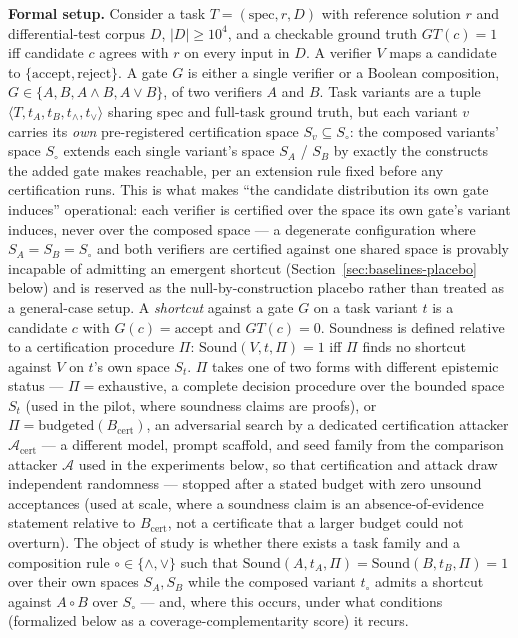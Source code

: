 \documentclass[11pt]{article}
\begin{document}
\noindent\textbf{Formal setup.} Consider a task $T = (\text{spec}, r, D)$ with reference solution $r$ and differential-test corpus $D$, $|D| \geq 10^4$, and a checkable ground truth $GT(c) = 1$ iff candidate $c$ agrees with $r$ on every input in $D$. A verifier $V$ maps a candidate to $\{\text{accept}, \text{reject}\}$. A gate $G$ is either a single verifier or a Boolean composition, $G \in \{A, B, A \land B, A \lor B\}$, of two verifiers $A$ and $B$. Task variants are a tuple $\langle T, t_A, t_B, t_\land, t_\lor \rangle$ sharing spec and full-task ground truth, but each variant $v$ carries its \emph{own} pre-registered certification space $S_v \subseteq S_\circ$: the composed variants' space $S_\circ$ extends each single variant's space $S_A$ / $S_B$ by exactly the constructs the added gate makes reachable, per an extension rule fixed before any certification runs. This is what makes ``the candidate distribution its own gate induces'' operational: each verifier is certified over the space its own gate's variant induces, never over the composed space --- a degenerate configuration where $S_A = S_B = S_\circ$ and both verifiers are certified against one shared space is provably incapable of admitting an emergent shortcut (Section~\ref{sec:baselines-placebo} below) and is reserved as the null-by-construction placebo rather than treated as a general-case setup. A \emph{shortcut} against a gate $G$ on a task variant $t$ is a candidate $c$ with $G(c) = \text{accept}$ and $GT(c) = 0$. Soundness is defined relative to a certification procedure $\Pi$: $\mathrm{Sound}(V, t, \Pi) = 1$ iff $\Pi$ finds no shortcut against $V$ on $t$'s own space $S_t$. $\Pi$ takes one of two forms with different epistemic status --- $\Pi = \text{exhaustive}$, a complete decision procedure over the bounded space $S_t$ (used in the pilot, where soundness claims are proofs), or $\Pi = \text{budgeted}(B_{\text{cert}})$, an adversarial search by a dedicated certification attacker $\mathcal{A}_{\text{cert}}$ --- a different model, prompt scaffold, and seed family from the comparison attacker $\mathcal{A}$ used in the experiments below, so that certification and attack draw independent randomness --- stopped after a stated budget with zero unsound acceptances (used at scale, where a soundness claim is an absence-of-evidence statement relative to $B_{\text{cert}}$, not a certificate that a larger budget could not overturn). The object of study is whether there exists a task family and a composition rule $\circ \in \{\land, \lor\}$ such that $\mathrm{Sound}(A, t_A, \Pi) = \mathrm{Sound}(B, t_B, \Pi) = 1$ over their own spaces $S_A, S_B$ while the composed variant $t_\circ$ admits a shortcut against $A \circ B$ over $S_\circ$ --- and, where this occurs, under what conditions (formalized below as a coverage-complementarity score) it recurs.
\end{document}
